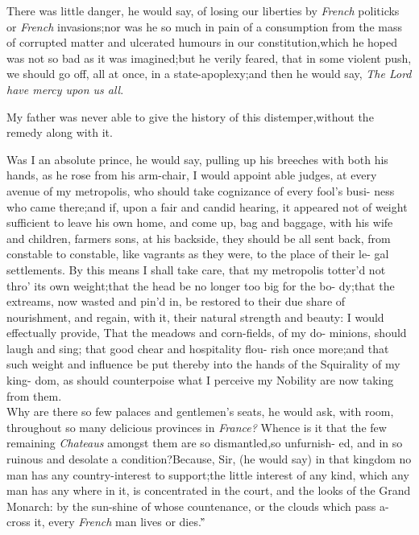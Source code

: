 \documentclass{article}
\begin{document}
There was little danger, he would say, of losing our liberties
by \textit{French} politicks or \textit{French}
invasions;\tsh  nor was he so much in pain of a consumption
from the mass of corrupted matter and ulcerated humours in our
constitution,\tsh\break which he hoped was not so bad as it was
imagined;\tsk  but he verily feared, that in some violent push, we
should go off, all at once, in a state-apoplexy;\tsk  and then he
would say, \textit{The Lord have mercy upon us all}.

My father was never able to give the history of this
distemper,\tsk  without the remedy along with it.

\indent\lqq Was I an absolute prince, he would\break
say, pulling up his breeches with both\break
his hands, as he rose from his arm-chair,\break
\lqq I would appoint able judges, at every\break
\lqq avenue of my metropolis, who should\break
\lqq take cognizance of every fool’s busi-\break
\lqq ness who came there;\tsk and if, upon\break
\lqq a fair and candid hearing, it appeared\break
\lqq not of weight sufficient to leave his\break
\lqq own home, and come up, bag and\break
\lqq baggage, with his wife and children,\break
\lqq farmers sons, \etc \etc at his backside,\break
\lqq they should be all sent back, from\break
\lqq constable to constable, like vagrants 
\lqq as they were, to the place of their le-\break
\lqq gal settlements. By this means I shall\break
\lqq take care, that my metropolis totter’d\break
\lqq not thro’ its own weight;\tsk  that the\break
\lqq head be no longer too big for the bo-\break
\lqq dy;\tsk  that the extreams, now wasted\break
\lqq and pin’d in, be restored to their due\break
\lqq share of nourishment, and regain, with\break
\lqq it, their natural strength and beauty:\tsk\break
\lqq I would effectually provide, That the\break
\lqq meadows and corn-fields, of my do-\break
\lqq minions, should laugh and sing;\tsh\break
\lqq that good chear and hospitality flou-\break
\lqq rish once more;\tsk  and that such weight\break
\lqq and influence be put thereby into the\break
\lqq hands of the Squirality of my king-\break
\lqq dom, as should counterpoise what I\break
\lqq perceive my Nobility are now taking\break
\lqq from them.\\
\newpage
\indent\lqq Why are there so few palaces and\break
\lqq gentlemen’s seats, he would ask, with\break
{}\break
room, \lqq throughout so many delicious\break
\lqq provinces in \textit{France?} Whence is it that\break
\lqq the few remaining \textit{Chateaus} amongst\break
\lqq them are so dismantled,\tsk  so unfurnish-\break
\lqq ed, and in so ruinous and desolate a\break
\lqq condition?\tsh  Because, Sir, (he would\break
say) \lqq in that kingdom no man has any\break
\lqq country-interest to support;\tsk  the little\break
\lqq interest of any kind, which any man\break
\lqq has any where in it, is concentrated in\break
\lqq the court, and the looks of the Grand\break
\lqq Monarch: by the sun-shine of whose\break
\lqq countenance, or the clouds which pass\break
\lqq a-cross it, every \textit{French} man lives or\break
\lqq dies.\.”
\end{document}
